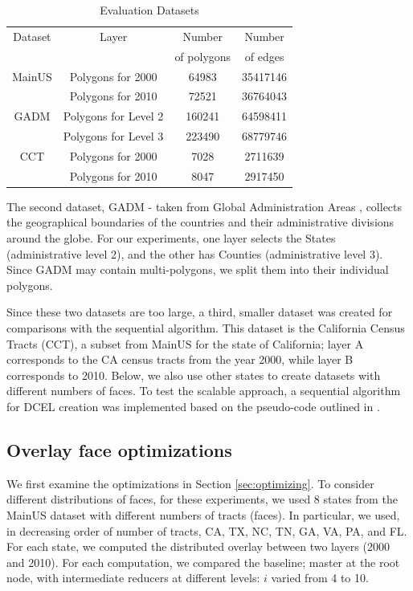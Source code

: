 \begin{table}
    \centering
    \caption{Evaluation Datasets}
    \label{tab:sdcel_datasets}
    \begin{tabular}{c c c c}
        \toprule
        Dataset & Layer & Number        & Number    \\
                &       & of polygons   & of edges  \\
        \midrule
        MainUS& Polygons for 2000 & 64983 & 35417146        \\
              & Polygons for 2010 & 72521 & 36764043        \\
        GADM  & Polygons for Level 2 & 160241 & 64598411    \\
              & Polygons for Level 3 & 223490 & 68779746    \\
        CCT   & Polygons for 2000 & 7028 & 2711639          \\
              & Polygons for 2010 & 8047 & 2917450          \\
        \bottomrule
    \end{tabular}
\end{table}

The second dataset, GADM - taken from Global Administration Areas \cite{gadm_data}, collects the geographical boundaries of the countries and their administrative divisions around the globe. For our experiments, one layer selects the States (administrative level 2), and the other has Counties (administrative level 3). Since GADM may contain multi-polygons, we split them into their individual polygons.

Since these two datasets are too large, a third, smaller dataset was created for comparisons with the sequential algorithm. This dataset is the California Census Tracts (CCT), a subset from MainUS for the state of California; layer A corresponds to the CA census tracts from the year 2000, while layer B corresponds to 2010. Below, we also use other states to create datasets with different numbers of faces.  To test the scalable approach, a sequential algorithm for DCEL creation was implemented based on the pseudo-code outlined in \cite{berg_computational_2008}.

\subsection{Overlay face optimizations}\label{sec:overlay_optimization}
We first examine the optimizations in Section \ref{sec:optimizing}. To consider different distributions of faces, for these experiments, we used 8 states from the MainUS dataset with different numbers of tracts (faces). In particular, we used, in decreasing order of number of tracts, CA, TX, NC, TN, GA, VA, PA, and FL. For each state, we computed the distributed overlay between two layers (2000 and 2010). For each computation, we compared the baseline; master at the root node, with intermediate reducers at different levels: $i$ varied from 4 to 10. 

